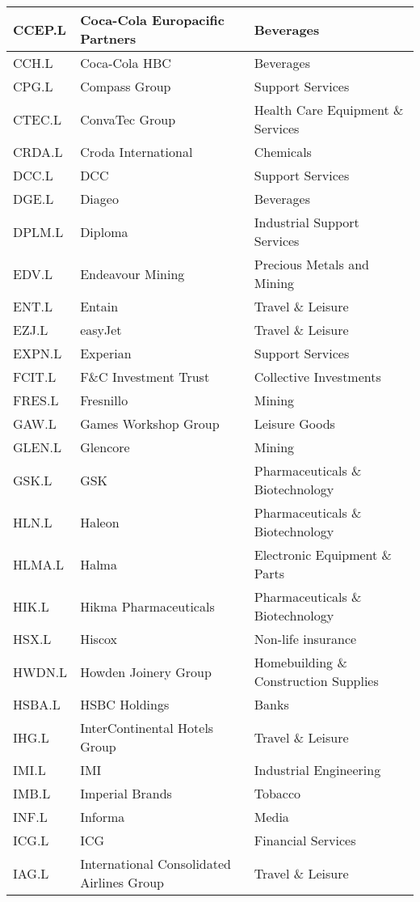 \begin{longtable}{|p{2cm}|p{4cm}|p{6cm}|}
CCEP.L & Coca-Cola Europacific Partners & Beverages \\ \hline
CCH.L & Coca-Cola HBC & Beverages \\ \hline
CPG.L & Compass Group & Support Services \\ \hline
CTEC.L & ConvaTec Group & Health Care Equipment \& Services \\ \hline
CRDA.L & Croda International & Chemicals \\ \hline
DCC.L & DCC & Support Services \\ \hline
DGE.L & Diageo & Beverages \\ \hline
DPLM.L & Diploma & Industrial Support Services \\ \hline
EDV.L & Endeavour Mining & Precious Metals and Mining \\ \hline
ENT.L & Entain & Travel \& Leisure \\ \hline
EZJ.L & easyJet & Travel \& Leisure \\ \hline
EXPN.L & Experian & Support Services \\ \hline
FCIT.L & F\&C Investment Trust & Collective Investments \\ \hline
FRES.L & Fresnillo & Mining \\ \hline
GAW.L & Games Workshop Group & Leisure Goods \\ \hline
GLEN.L & Glencore & Mining \\ \hline
GSK.L & GSK & Pharmaceuticals \& Biotechnology \\ \hline
HLN.L & Haleon & Pharmaceuticals \& Biotechnology \\ \hline
HLMA.L & Halma & Electronic Equipment \& Parts \\ \hline
HIK.L & Hikma Pharmaceuticals & Pharmaceuticals \& Biotechnology \\ \hline
HSX.L & Hiscox & Non-life insurance \\ \hline
HWDN.L & Howden Joinery Group & Homebuilding \& Construction Supplies \\ \hline
HSBA.L & HSBC Holdings & Banks \\ \hline
IHG.L & InterContinental Hotels Group & Travel \& Leisure \\ \hline
IMI.L & IMI & Industrial Engineering \\ \hline
IMB.L & Imperial Brands & Tobacco \\ \hline
INF.L & Informa & Media \\ \hline
ICG.L & ICG & Financial Services \\ \hline
IAG.L & International Consolidated Airlines Group & Travel \& Leisure \\ \hline

\end{longtable}
